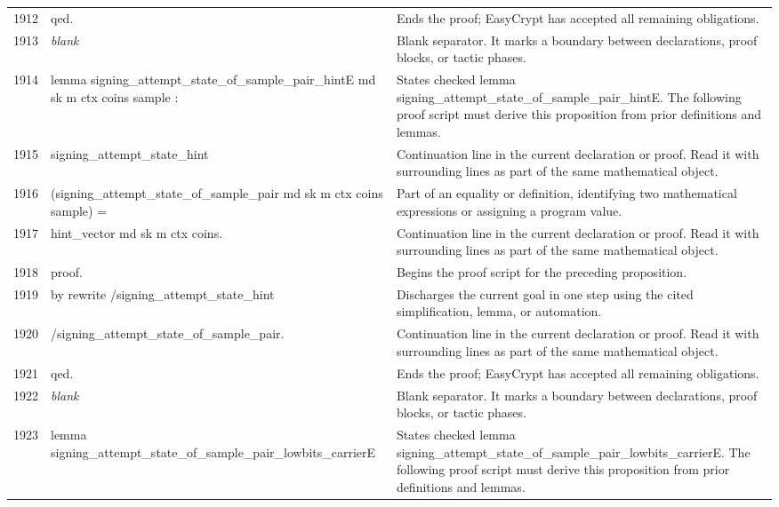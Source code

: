 \documentclass[10pt]{article}
\begin{document}
\begin{longtable}{r L{0.53\textwidth} L{0.37\textwidth}}
1912 & {\ttfamily\scriptsize qed.} & Ends the proof; EasyCrypt has accepted all remaining obligations. \\
1913 & {\ttfamily\scriptsize \emph{blank}} & Blank separator.  It marks a boundary between declarations, proof blocks, or tactic phases. \\
1914 & {\ttfamily\scriptsize lemma signing\_attempt\_state\_of\_sample\_pair\_hintE md sk m ctx coins sample :} & States checked lemma signing\_attempt\_state\_of\_sample\_pair\_hintE.  The following proof script must derive this proposition from prior definitions and lemmas. \\
1915 & {\ttfamily\scriptsize   signing\_attempt\_state\_hint} & Continuation line in the current declaration or proof.  Read it with surrounding lines as part of the same mathematical object. \\
1916 & {\ttfamily\scriptsize     (signing\_attempt\_state\_of\_sample\_pair md sk m ctx coins sample) =} & Part of an equality or definition, identifying two mathematical expressions or assigning a program value. \\
1917 & {\ttfamily\scriptsize   hint\_vector md sk m ctx coins.} & Continuation line in the current declaration or proof.  Read it with surrounding lines as part of the same mathematical object. \\
1918 & {\ttfamily\scriptsize proof.} & Begins the proof script for the preceding proposition. \\
1919 & {\ttfamily\scriptsize by rewrite /signing\_attempt\_state\_hint} & Discharges the current goal in one step using the cited simplification, lemma, or automation. \\
1920 & {\ttfamily\scriptsize            /signing\_attempt\_state\_of\_sample\_pair.} & Continuation line in the current declaration or proof.  Read it with surrounding lines as part of the same mathematical object. \\
1921 & {\ttfamily\scriptsize qed.} & Ends the proof; EasyCrypt has accepted all remaining obligations. \\
1922 & {\ttfamily\scriptsize \emph{blank}} & Blank separator.  It marks a boundary between declarations, proof blocks, or tactic phases. \\
1923 & {\ttfamily\scriptsize lemma signing\_attempt\_state\_of\_sample\_pair\_lowbits\_carrierE} & States checked lemma signing\_attempt\_state\_of\_sample\_pair\_lowbits\_carrierE.  The following proof script must derive this proposition from prior definitions and lemmas. \\

\end{longtable}
\end{document}
